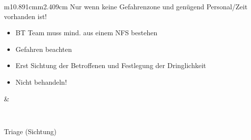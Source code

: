 \documentclass{article}
\begin{document}
\begin{center}
\tablehead{}\begin{supertabular}{m{10.891cm}m{2.409cm}}
{\mdseries Nur wenn keine Gefahrenzone und gen\"ugend Personal/Zeit
vorhanden ist!}

\begin{itemize}
\item {\mdseries BT Team muss mind. aus einem NFS bestehen}

\item {\mdseries Gefahren beachten}

\item {\mdseries Erst Sichtung der Betroffenen und Festlegung der
Dringlichkeit}

\item {\mdseries Nicht behandeln!}

\end{itemize}
 &
{%
 \par}

\\
\end{supertabular}
\end{center}
{\mdseries\color{black}
Triage (Sichtung)}
\end{document}

